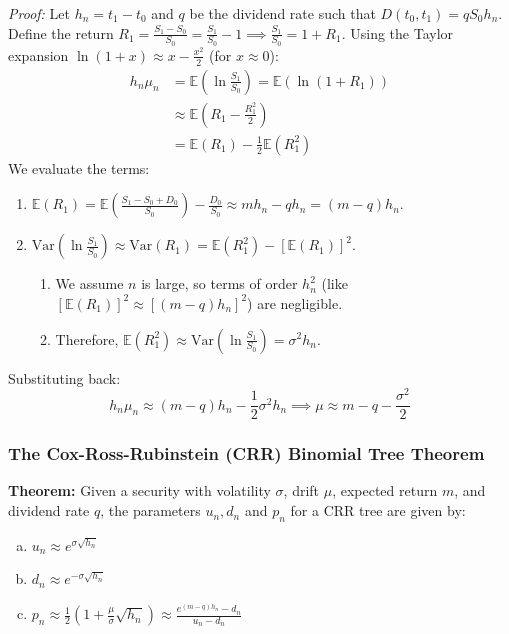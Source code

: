 \textit{Proof:}
Let \(h_n = t_1 - t_0\) and \(q\) be the dividend rate such that \(D(t_0, t_1) = q S_0 h_n\). Define the return \(R_1 = \frac{S_1 - S_0}{S_0} = \frac{S_1}{S_0} - 1 \implies \frac{S_1}{S_0} = 1 + R_1\). Using the Taylor expansion \(\ln(1+x) \approx x - \frac{x^2}{2}\) (for \(x \approx 0\)):
\begin{align*}
    h_n \mu_n &= \mathbb{E}(\ln \frac{S_1}{S_0}) = \mathbb{E}(\ln(1+R_1)) \\
    &\approx \mathbb{E}(R_1 - \frac{R_1^2}{2}) \\
    &= \mathbb{E}(R_1) - \frac{1}{2}\mathbb{E}(R_1^2)
\end{align*}
We evaluate the terms:
\begin{enumerate}
    \item \(\mathbb{E}(R_1) = \mathbb{E}(\frac{S_1-S_0+D_0}{S_0}) - \frac{D_0}{S_0} \approx m h_n - q h_n = (m-q)h_n\).
    \item \(\text{Var}(\ln \frac{S_1}{S_0}) \approx \text{Var}(R_1) = \mathbb{E}(R_1^2) - [\mathbb{E}(R_1)]^2\).
    \begin{enumerate}
        \item We assume \(n\) is large, so terms of order \(h_n^2\) (like \([\mathbb{E}(R_1)]^2 \approx [(m-q)h_n]^2\)) are negligible.
        \item Therefore, \(\mathbb{E}(R_1^2) \approx \text{Var}(\ln \frac{S_1}{S_0}) = \sigma^2 h_n\).
    \end{enumerate}
\end{enumerate}
Substituting back:
\begin{equation*}
    h_n \mu_n \approx (m-q)h_n - \frac{1}{2}\sigma^2 h_n \implies \mu \approx m - q - \frac{\sigma^2}{2}
\end{equation*}

\subsubsection{The Cox-Ross-Rubinstein (CRR) Binomial Tree Theorem}
\begin{framed}
\textbf{Theorem: } Given a security with volatility \(\sigma\), drift \(\mu\), expected return \(m\), and dividend rate \(q\), the parameters \(u_n, d_n\) and \(p_n\) for a CRR tree are given by:
\begin{enumerate}[(a)]
    \item \(u_n \approx e^{\sigma\sqrt{h_n}}\)
    \item \(d_n \approx e^{-\sigma\sqrt{h_n}}\)
    \item \(p_n \approx \frac{1}{2}\left(1 + \frac{\mu}{\sigma}\sqrt{h_n}\right) \approx \frac{e^{(m-q)h_n} - d_n}{u_n - d_n}\)
\end{enumerate}
\end{framed}

